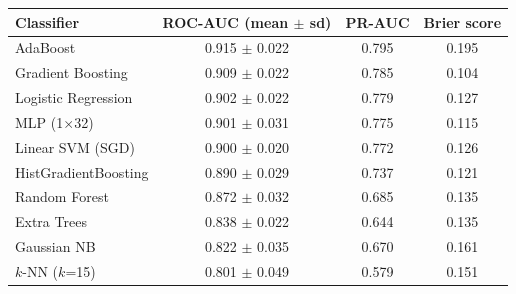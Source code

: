 \begin{tabular}{lccc}
\toprule
Classifier & ROC-AUC (mean $\pm$ sd) & PR-AUC & Brier score \\
\midrule
AdaBoost & 0.915 $\pm$ 0.022 & 0.795 & 0.195 \\
Gradient Boosting & 0.909 $\pm$ 0.022 & 0.785 & 0.104 \\
Logistic Regression & 0.902 $\pm$ 0.022 & 0.779 & 0.127 \\
MLP (1$\times$32) & 0.901 $\pm$ 0.031 & 0.775 & 0.115 \\
Linear SVM (SGD) & 0.900 $\pm$ 0.020 & 0.772 & 0.126 \\
HistGradientBoosting & 0.890 $\pm$ 0.029 & 0.737 & 0.121 \\
Random Forest & 0.872 $\pm$ 0.032 & 0.685 & 0.135 \\
Extra Trees & 0.838 $\pm$ 0.022 & 0.644 & 0.135 \\
Gaussian NB & 0.822 $\pm$ 0.035 & 0.670 & 0.161 \\
$k$-NN ($k$=15) & 0.801 $\pm$ 0.049 & 0.579 & 0.151 \\
\bottomrule
\end{tabular}
